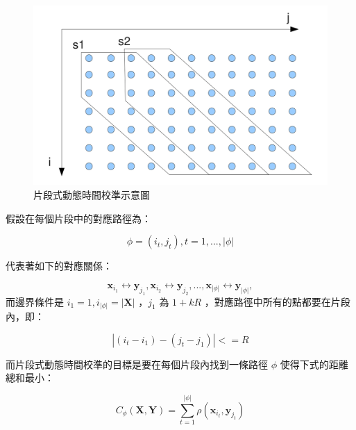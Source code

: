 \begin{figure}[h]
\centering
\includegraphics[scale=0.3]{images/chap4_sdtw.png}
\caption{片段式動態時間校準示意圖~\cite{zhang2009unsupervised}} \label{fig:chap4_sdtw}
\end{figure}

假設在每個片段中的對應路徑為：

\[
\phi = (i_t, j_t), t = 1,...,|\phi|
\]

代表著如下的對應關係：

\[
\mathbf{x}_{i_1} \leftrightarrow \mathbf{y}_{j_1}, \mathbf{x}_{i_2} \leftrightarrow \mathbf{y}_{j_2},...,\mathbf{x}_{|\phi|} \leftrightarrow \mathbf{y}_{|\phi|},
\]
而邊界條件是 $i_1 = 1, i_{|\phi|} = |\mathbf{X}|$ ，$j_1$ 為 $1+kR$ ，對應路徑中所有的點都要在片段內，即：

\[
|(i_t-i_1)-(j_t-j_1)| <= R
\]

而片段式動態時間校準的目標是要在每個片段內找到一條路徑 $\phi$ 使得下式的距離總和最小：

\begin{equation}
C_{\phi}(\mathbf{X}, \mathbf{Y}) = \sum_{t=1}^{|\phi|} \rho(\mathbf{x}_{i_t},\mathbf{y}_{j_t})
\end{equation}

